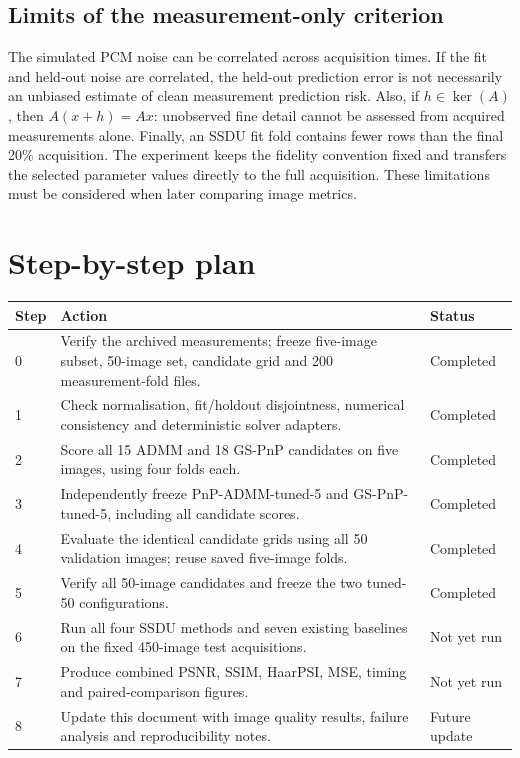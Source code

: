 \documentclass[a4paper,10pt]{article}
\begin{document}
\subsection*{Limits of the measurement-only criterion}

The simulated PCM noise can be correlated across acquisition times. If the fit and held-out noise are correlated, the held-out prediction error is not necessarily an unbiased estimate of clean measurement prediction risk. Also, if $h\in\ker(A)$, then $A(x+h)=Ax$: unobserved fine detail cannot be assessed from acquired measurements alone. Finally, an SSDU fit fold contains fewer rows than the final 20\% acquisition. The experiment keeps the fidelity convention fixed and transfers the selected parameter values directly to the full acquisition. These limitations must be considered when later comparing image metrics.

\section{Step-by-step plan}

\small
\begin{tabularx}{\linewidth}{@{}p{8mm}X p{22mm}@{}}
\toprule
\textbf{Step} & \textbf{Action} & \textbf{Status} \\
\midrule
0 & Verify the archived measurements; freeze five-image subset, 50-image set, candidate grid and 200 measurement-fold files. & Completed \\
1 & Check normalisation, fit/holdout disjointness, numerical consistency and deterministic solver adapters. & Completed \\
2 & Score all 15 ADMM and 18 GS-PnP candidates on five images, using four folds each. & Completed \\
3 & Independently freeze PnP-ADMM-tuned-5 and GS-PnP-tuned-5, including all candidate scores. & Completed \\
4 & Evaluate the identical candidate grids using all 50 validation images; reuse saved five-image folds. & Completed \\
5 & Verify all 50-image candidates and freeze the two tuned-50 configurations. & Completed \\
6 & Run all four SSDU methods and seven existing baselines on the fixed 450-image test acquisitions. & Not yet run \\
7 & Produce combined PSNR, SSIM, HaarPSI, MSE, timing and paired-comparison figures. & Not yet run \\
8 & Update this document with image quality results, failure analysis and reproducibility notes. & Future update \\
\bottomrule
\end{tabularx}
\normalsize
\end{document}
